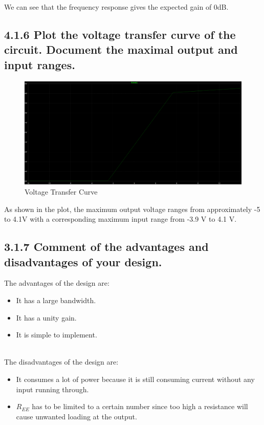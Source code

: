 \documentclass[12pt]{article}
\begin{document}
We can see that the frequency response gives the expected gain of 0dB.

\subsection*{4.1.6 Plot the voltage transfer curve of the circuit. Document the maximal output and input ranges.}

\begin{figure}[H]
    \centering
    \includegraphics[width=1.0\textwidth]{416.PNG}
    \caption{Voltage Transfer Curve}
\end{figure}

As shown in the plot, the maximum output voltage 
ranges from approximately -5 to 4.1V with a corresponding
maximum input range from -3.9 V to 4.1 V.

\subsection*{3.1.7 Comment of the advantages and disadvantages of your design.}

The advantages of the design are: 
\begin{itemize}
    \item It has a large bandwidth.
    \item It has a unity gain.
    \item It is simple to implement.
\end{itemize} \\

The disadvantages of the design are: 
\begin{itemize}
    \item It consumes a lot of power because it is still consuming current without any input running through.
    \item $R_{EE}$ has to be limited to a certain number since too high a resistance will cause unwanted loading at the output.
\end{itemize}
\end{document}
